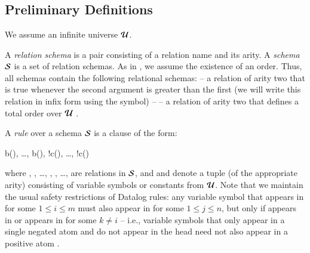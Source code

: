 \section{\large \bf \lang}
\label{sec:foundation}

\subsection{Preliminary Definitions}


We assume an infinite universe $\univ$.

A {\em relation schema} is a pair consisting of a relation name and its arity.
A {\em schema} $\schema$ is a set of relation schemas.   As in , we assume the existence of an order.  Thus, all schemas contain the following relational schemas:  -- a relation of arity two that is true whenever the second argument is greater than the first (we will write this relation in infix form using the \dedalus{<} symbol) --  -- a relation of arity two that defines a total order over $\univ$ .

A {\em rule} over a schema $\schema$ is a clause of the form:

\begin{Drules}
        {b(), \ldots, b(), !c(), \ldots, !c()}
\end{Drules}

where , , \ldots, ,
, \ldots,  are relations in
$\schema$, and  and 
denote a tuple (of the appropriate arity) consisting of variable symbols or
constants from $\univ$.  Note that we maintain the usual safety
restrictions of Datalog rules: any variable symbol  that appears in
 for some $1 \leq i \leq m$ must also appear in
 for some $1 \leq j \leq n$, but only if 
appears in  or  appears in
 for some $k \neq i$ -- i.e., variable symbols that
only appear in a single negated atom and do not appear in the head need not also
appear in a positive atom .


